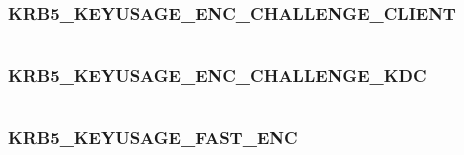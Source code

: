 \documentclass[letterpaper,10pt,english]{sphinxmanual}
\begin{document}
\subsubsection{KRB5\_KEYUSAGE\_ENC\_CHALLENGE\_CLIENT}
\label{appdev/refs/macros/KRB5_KEYUSAGE_ENC_CHALLENGE_CLIENT:krb5-keyusage-enc-challenge-client-data}\label{appdev/refs/macros/KRB5_KEYUSAGE_ENC_CHALLENGE_CLIENT::doc}\label{appdev/refs/macros/KRB5_KEYUSAGE_ENC_CHALLENGE_CLIENT:krb5-keyusage-enc-challenge-client}

\begin{fulllineitems}
\label{appdev/refs/macros/KRB5_KEYUSAGE_ENC_CHALLENGE_CLIENT:KRB5_KEYUSAGE_ENC_CHALLENGE_CLIENT}
\end{fulllineitems}


\begin{tabulary}{\linewidth}{|L|L|}
\hline

 & 
\\
\hline\end{tabulary}



\subsubsection{KRB5\_KEYUSAGE\_ENC\_CHALLENGE\_KDC}
\label{appdev/refs/macros/KRB5_KEYUSAGE_ENC_CHALLENGE_KDC:krb5-keyusage-enc-challenge-kdc-data}\label{appdev/refs/macros/KRB5_KEYUSAGE_ENC_CHALLENGE_KDC:krb5-keyusage-enc-challenge-kdc}\label{appdev/refs/macros/KRB5_KEYUSAGE_ENC_CHALLENGE_KDC::doc}

\begin{fulllineitems}
\label{appdev/refs/macros/KRB5_KEYUSAGE_ENC_CHALLENGE_KDC:KRB5_KEYUSAGE_ENC_CHALLENGE_KDC}
\end{fulllineitems}


\begin{tabulary}{\linewidth}{|L|L|}
\hline

 & 
\\
\hline\end{tabulary}



\subsubsection{KRB5\_KEYUSAGE\_FAST\_ENC}
\label{appdev/refs/macros/KRB5_KEYUSAGE_FAST_ENC:krb5-keyusage-fast-enc-data}\label{appdev/refs/macros/KRB5_KEYUSAGE_FAST_ENC:krb5-keyusage-fast-enc}\label{appdev/refs/macros/KRB5_KEYUSAGE_FAST_ENC::doc}
\end{document}
